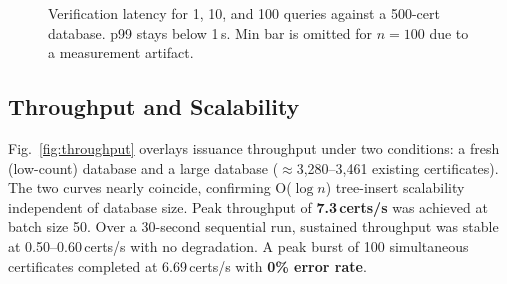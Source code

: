 \documentclass[conference,a4paper]{IEEEtran}
\begin{document}
\begin{figure}[t]
\centering
{}
\caption{Verification latency for 1, 10, and 100 queries against a 500-cert database. p99 stays below 1\,s. Min bar is omitted for $n{=}100$ due to a measurement artifact.}
\label{fig:verif_perc}
\end{figure}

\subsection{Throughput and Scalability}
Fig.~\ref{fig:throughput} overlays issuance throughput under two conditions: a fresh (low-count) database and a large database ($\approx$3,280--3,461 existing certificates). The two curves nearly coincide, confirming O($\log n$) tree-insert scalability independent of database size. Peak throughput of \textbf{7.3\,certs/s} was achieved at batch size 50. Over a 30-second sequential run, sustained throughput was stable at 0.50--0.60\,certs/s with no degradation. A peak burst of 100 simultaneous certificates completed at 6.69\,certs/s with \textbf{0\% error rate}.
\end{document}
